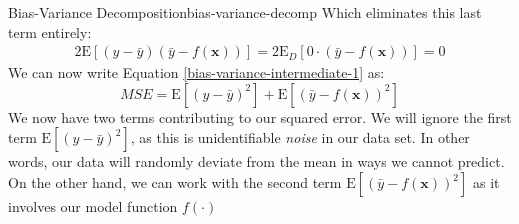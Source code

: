 \begin{derivation}{Bias-Variance Decomposition}{bias-variance-decomp}
    Which eliminates this last term entirely:
    \begin{align*}
        2\mathrm{E}[(y - \bar{y})(\bar{y} - f(\textbf{x}))] = 2\mathrm{E}_{D}[0 \cdot (\bar{y} - f(\textbf{x}))] = 0
    \end{align*}
    We can now write Equation \ref{bias-variance-intermediate-1} as:
    \begin{equation} \label{bias-variance-intermediate-2}
        \textit{MSE} = \mathrm{E}[(y - \bar{y})^{2}] + \mathrm{E}[(\bar{y} - f(\textbf{x}))^{2}]
    \end{equation}
    We now have two terms contributing to our squared error. We will ignore the first term $\mathrm{E}[(y - \bar{y})^{2}]$, as this is unidentifiable \textit{noise} in our data set. In other words, our data will randomly deviate from the mean in ways we cannot predict. On the other hand, we can work with the second term $\mathrm{E}[(\bar{y} - f(\textbf{x}))^{2}]$ as it involves our model function $f(\cdot)$ \\


\end{derivation}
